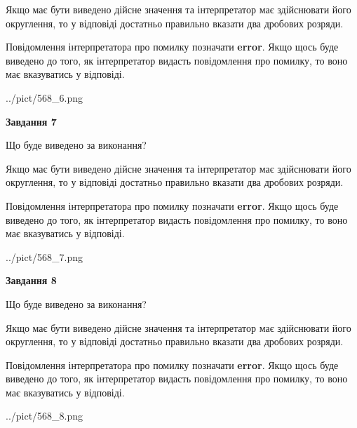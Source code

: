 \documentclass[12pt, ukrainian]{article}
\begin{document}
{\begin {Large}
Якщо має бути виведено дійсне значення та інтерпретатор має здійснювати його округлення, 
то у відповіді достатньо правильно вказати два дробових розряди.

Повідомлення інтерпретатора про помилку позначати \textbf{error}.
Якщо щось буде виведено до того, як інтерпретатор видасть повідомлення про помилку, 
то воно має вказуватись у відповіді. \par

\begin{center}
	{../pict/568_6.png}
\end{center}
\newpage

{\begin {center}\textbf{Завдання 7}\end {center}}\par
Що буде виведено за виконання? \par

Якщо має бути виведено дійсне значення та інтерпретатор має здійснювати його округлення, 
то у відповіді достатньо правильно вказати два дробових розряди.

Повідомлення інтерпретатора про помилку позначати \textbf{error}.
Якщо щось буде виведено до того, як інтерпретатор видасть повідомлення про помилку, 
то воно має вказуватись у відповіді. \par

\begin{center}
	{../pict/568_7.png}
\end{center}
\newpage

{\begin {center}\textbf{Завдання 8}\end {center}}\par
Що буде виведено за виконання? \par

Якщо має бути виведено дійсне значення та інтерпретатор має здійснювати його округлення, 
то у відповіді достатньо правильно вказати два дробових розряди.

Повідомлення інтерпретатора про помилку позначати \textbf{error}.
Якщо щось буде виведено до того, як інтерпретатор видасть повідомлення про помилку, 
то воно має вказуватись у відповіді. \par

\begin{center}
	{../pict/568_8.png}
\end{center}
\newpage


\end{Large}}
\end{document}
